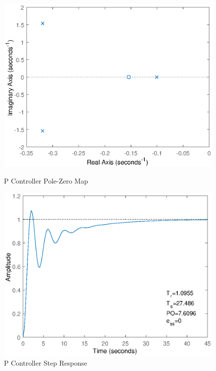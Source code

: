 \documentclass{article}
\begin{document}
    \begin{figure}[ht]
        \centering
        \begin{minipage}[t]{.5\textwidth}
            \includegraphics[scale=.5]{PPoles.eps}
            \caption{P Controller Pole-Zero Map}
        \end{minipage}%
        \begin{minipage}[t]{.5\textwidth}
            \includegraphics[scale=.5]{PResponse.eps}
            \caption{P Controller Step Response}
        \end{minipage}
    \end{figure}
\end{document}
